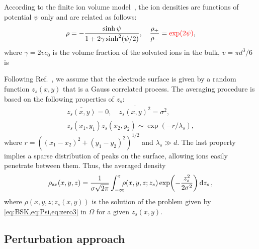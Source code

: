According to the finite ion volume model~\cite{kornyshev2007double}, the ion densities are functions of potential $\psi$ only and are related as follows:
\begin{equation}\label{eq:rho}
    \rho = -\frac{\sinh\psi}{1+2\gamma\sinh^2(\psi/2)}, \quad \frac{\rho_+}{\rho_-} = \textcolor{red}{\exp(2\psi)},
\end{equation}
where $\gamma=2v c_0$ is the volume fraction of the solvated ions in the bulk, $v=\pi d^3/6$ is %

Following Ref.~\cite{aslyamov2021electrolyte}, we assume that the electrode surface is given by a random function $z_s(x,y)$ that is a Gauss correlated process. The averaging procedure is based on the following properties of $z_s$:
\begin{equation}\label{eq:z_s_aver}
    \begin{gathered}
        \overline{z_s(x,y)} = 0, \quad \overline{z_s(x,y)^2} = \sigma^2, \\
        \overline{z_s(x_1,y_1)z_s(x_2,y_2)}\sim\exp(-r/\lambda_s),
    \end{gathered}
\end{equation}
where $r=((x_1-x_2)^2+(y_1-y_2)^2)^{1/2}$ and $\lambda_s\gg d$. The last property implies a sparse distribution of peaks on the surface, allowing ions easily penetrate between them. Thus, the averaged density
\begin{equation}\label{eq:rho_av}
    \rhoav(x,y,z) = \frac1{\sigma\sqrt{2\pi}}\int_{\mathrlap{-\infty}}^{z} \rho(x,y,z; z_s)\exp(-\frac{z_s^2}{2\sigma^2})\dd{z_s},
\end{equation}
where $\rho(x,y,z; z_s(x,y))$ is the solution of the problem given by \cref{eq:BSK,eq:Psi,eq:zero3} in $\Omega$ for a given $z_s(x,y)$.

\subsection{Perturbation approach}

